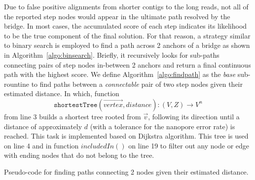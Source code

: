 \documentclass[10pt,letterpaper]{article}
\begin{document}
Due to false positive alignments from shorter contigs to the long reads, not all of the reported step nodes would appear in the ultimate path resolved by the bridge. 
In most cases, the accumulated score of each step indicates its likelihood to be the true component of the final solution.
For that reason, a strategy similar to binary search is employed to find a path across 2 anchors of a bridge as shown in Algorithm~\ref{algo:binsearch}. Briefly, it recursively looks for sub-paths connecting pairs of step nodes in-between 2 anchors and return a final continuous path with the highest score.
We define Algorithm~\ref{algo:findpath} as the \emph{base} sub-rountine to find paths between a \emph{connectable} pair of two step nodes given their estimated distance. In which, function 
\[
\mathtt{shortestTree}(\overrightarrow{vertex},distance) : (V,Z) \rightarrow V^n
\]
from line 3 builds a shortest tree rooted from $\overrightarrow{v}$, following its direction until a distance of approximately $d$ (with a tolerance for the nanopore error rate) is reached. This task is implemented based on Dijkstra algorithm.
This tree is used on line 4 and in function $includedIn()$ on line 19 to filter out any node or edge with ending nodes that do not belong to the tree.

\begin{algorithm}[!hpt]
\DontPrintSemicolon
{}
\caption{Pseudo-code for finding paths connecting 2 nodes given their estimated distance.}
\label{algo:findpath}
\end{algorithm}
\end{document}
